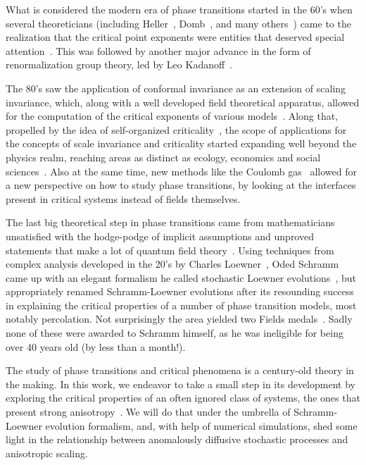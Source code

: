 What is considered the modern era of phase transitions started in the 60's when
several theoreticians (including Heller~\cite{Heller1967},
Domb~\cite{Domb1965}, and many others~\cite{Fisher1967}) came to the
realization that the critical point exponents were entities that deserved
special attention~\cite{Stanley1999, Stanley1971}. This was followed by another
major advance in the form of renormalization group theory, led by Leo
Kadanoff~\cite{Kadanoff1966}.

The 80's saw the application of conformal invariance as an extension of scaling
invariance, which, along with a well developed field theoretical apparatus,
allowed for the computation of the critical exponents of various
models~\cite{Belavin1984, Henkel2013}. Along that, propelled by the idea of
self-organized criticality~\cite{Bak1987}, the scope of applications for the
concepts of scale invariance and criticality started expanding well beyond the
physics realm, reaching areas as distinct as ecology, economics and social
sciences~\cite{Bak1996, Christensen2005}. Also at the same time, new methods
like the Coulomb gas~\cite{Nienhuis1984, Minnhagen1987} allowed for a new
perspective on how to study phase transitions, by looking at the interfaces
present in critical systems instead of fields themselves.

The last big theoretical step in phase transitions came from mathematicians
unsatisfied with the hodge-podge of implicit assumptions and unproved
statements that make a lot of quantum field theory~\cite{Langlands1994,
Cardy2005}. Using techniques from complex analysis developed in the 20's by
Charles Loewner~\cite{Loewner1923}, Oded Schramm came up with an elegant
formalism he called stochastic Loewner evolutions~\cite{Schramm2000}, but
appropriately renamed Schramm-Loewner evolutions after its resounding success
in explaining the critical properties of a number of phase transition models,
most notably percolation. Not surprisingly the area yielded two Fields
medals~\cite{Mackenzie2006, Kesten2010}. Sadly none of these were awarded to
Schramm himself, as he was ineligible for being over 40 years old (by less
than a month!).

The study of phase transitions and critical phenomena is a century-old theory
in the making. In this work, we endeavor to take a small step in its
development by exploring the critical properties of an often ignored class of
systems, the ones that present strong anisotropy~\cite{Henkel1994}. We will do
that under the umbrella of Schramm-Loewner evolution formalism, and, with help
of numerical simulations, shed some light in the relationship between
anomalously diffusive stochastic processes and anisotropic scaling.
